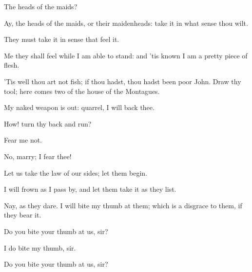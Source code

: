 \begin{speech}
The heads of the maids?
\end{speech}
\begin{speech}
Ay, the heads of the maids, or their
maidenheads: take it in what sense thou wilt.
\end{speech}
\begin{speech}
They must take it in sense that feel it.
\end{speech}
\begin{speech}
Me they shall feel while I am able
to stand: and 'tis known I am a pretty piece
of flesh.
\end{speech}
\begin{speech}
'Tis well thou art not fish; if thou
hadst, thou hadst been poor John. Draw thy
tool; here comes two of the house of the Montagues.
\end{speech}
\begin{speech}
My naked weapon is out: quarrel, I
will back thee.
\end{speech}
\begin{speech}
How! turn thy back and run?
\end{speech}
\begin{speech}
Fear me not.
\end{speech}
\begin{speech}
No, marry; I fear thee!
\end{speech}
\begin{speech}
Let us take the law of our sides; let
them begin.
\end{speech}
\begin{speech}
I will frown as I pass by, and let
them take it as they list.
\end{speech}
\begin{speech}
Nay, as they dare.   I will bite my
thumb at them; which is a disgrace to them, if they
bear it.
\end{speech}
\begin{speech}
Do you bite your thumb at us, sir?
\end{speech}
\begin{speech}
I do bite my thumb, sir.
\end{speech}
\begin{speech}
Do you bite your thumb at us, sir?
\end{speech}
